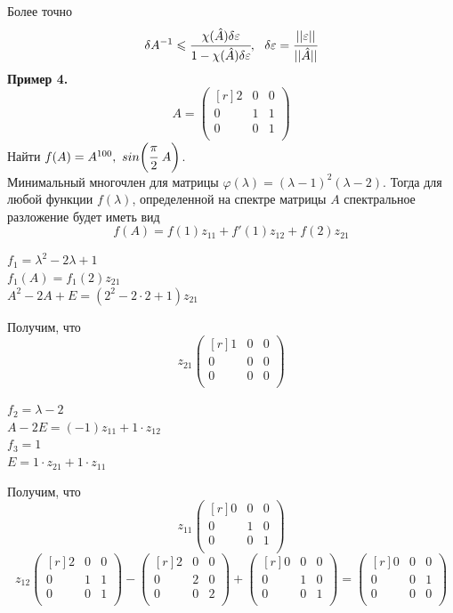 \documentclass[12pt]{article}
\theoremstyle{definition}
\numberwithin{equation}{section}
\begin{document}
Более точно $$\delta A^{-1}\leqslant \cfrac{\chi(\hat A)\delta \varepsilon}{1-\chi(\hat A)\delta \varepsilon},~~\delta \varepsilon=\cfrac{||\varepsilon||}{||\hat A||}$$
\textbf{Пример 4.}\\
\[A=\begin{pmatrix}[r]
2 & 0 & 0 \\
0 & 1 & 1 \\
0 & 0 & 1 \\
\end{pmatrix}\]
Найти $f(A)=A^{100},~ sin\bigg(\cfrac{\pi}{2}~A\bigg)$.\\
Минимальный многочлен для матрицы $\varphi(\lambda)=(\lambda-1)^2(\lambda-2)$. Тогда для любой функции $f(\lambda)$, определенной на спектре матрицы $A$ спектральное разложение будет иметь вид $$f(A)=f(1)z_{11}+f'(1)z_{12}+f(2)z_{21}$$
\begin{center}
$f_1=\lambda^2-2\lambda+1$\\
$f_1(A)=f_1(2)z_{21}$\\
$A^2-2A+E=(2^2-2\cdot 2+1)z_{21}$
\end{center}
Получим, что \[z_{21}\begin{pmatrix}[r]
1 & 0 & 0 \\
0 & 0 & 0 \\
0 & 0 & 0 \\
\end{pmatrix}\]
\begin{center}
$f_2=\lambda-2$\\
$A-2E=(-1)z_{11}+1\cdot z_{12}$\\
$f_3=1$\\
$E=1\cdot z_{21}+1\cdot z_{11}$
\end{center}
Получим, что \[z_{11}\begin{pmatrix}[r]
0 & 0 & 0 \\
0 & 1 & 0 \\
0 & 0 & 1 \\
\end{pmatrix}\]
\[z_{12}\begin{pmatrix}[r]
2 & 0 & 0 \\
0 & 1 & 1 \\
0 & 0 & 1 \\
\end{pmatrix} - \begin{pmatrix}[r]
2 & 0 & 0 \\
0 & 2 & 0 \\
0 & 0 & 2 \\
\end{pmatrix} + \begin{pmatrix}[r]
0 & 0 & 0 \\
0 & 1 & 0 \\
0 & 0 & 1 \\
\end{pmatrix} = \begin{pmatrix}[r]
0 & 0 & 0 \\
0 & 0 & 1 \\
0 & 0 & 0 \\
\end{pmatrix}\]
\end{document}
